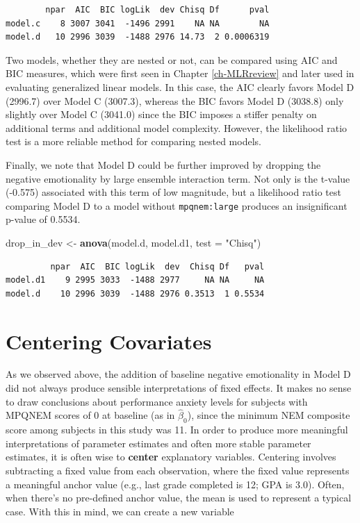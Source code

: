 \documentclass[
]{krantz}
\newenvironment{Shaded}{\begin{snugshade}}{\end{snugshade}}
\newcommand{\AttributeTok}[1]{\textcolor[rgb]{0.27,0.27,0.27}{#1}}
\newcommand{\FunctionTok}[1]{\textcolor[rgb]{0.27,0.27,0.27}{\textbf{#1}}}
\newcommand{\NormalTok}[1]{#1}
\newcommand{\OtherTok}[1]{\textcolor[rgb]{0.37,0.37,0.37}{#1}}
\newcommand{\StringTok}[1]{\textcolor[rgb]{0.5,0.5,0.5}{#1}}
\begin{document}
\begin{verbatim}
        npar  AIC  BIC logLik  dev Chisq Df      pval
model.c    8 3007 3041  -1496 2991    NA NA        NA
model.d   10 2996 3039  -1488 2976 14.73  2 0.0006319
\end{verbatim}

Two models, whether they are nested or not, can be compared using AIC and BIC measures, which were first seen in Chapter \ref{ch-MLRreview} and later used in evaluating generalized linear models. In this case, the AIC clearly favors Model D (2996.7) over Model C (3007.3), whereas the BIC favors Model D (3038.8) only slightly over Model C (3041.0) since the BIC imposes a stiffer penalty on additional terms and additional model complexity. However, the likelihood ratio test is a more reliable method for comparing nested models.

Finally, we note that Model D could be further improved by dropping the negative emotionality by large ensemble interaction term. Not only is the t-value (-0.575) associated with this term of low magnitude, but a likelihood ratio test comparing Model D to a model without \texttt{mpqnem:large} produces an insignificant p-value of 0.5534.

\begin{Shaded}
\begin{Highlighting}[]
\NormalTok{drop\_in\_dev }\OtherTok{\textless{}{-}} \FunctionTok{anova}\NormalTok{(model.d, model.d1, }\AttributeTok{test =} \StringTok{"Chisq"}\NormalTok{)}
\end{Highlighting}
\end{Shaded}

\begin{verbatim}
         npar  AIC  BIC logLik  dev  Chisq Df   pval
model.d1    9 2995 3033  -1488 2977     NA NA     NA
model.d    10 2996 3039  -1488 2976 0.3513  1 0.5534
\end{verbatim}

\section{Centering Covariates}\label{sec:modele}

As we observed above, the addition of baseline negative emotionality in Model D did not always produce sensible interpretations of fixed effects. It makes no sense to draw conclusions about performance anxiety levels for subjects with MPQNEM scores of 0 at baseline (as in \(\hat{\beta}_{0}\)), since the minimum NEM composite score among subjects in this study was 11. In order to produce more meaningful interpretations of parameter estimates and often more stable parameter estimates, it is often wise to \textbf{center}  explanatory variables. Centering involves subtracting a fixed value from each observation, where the fixed value represents a meaningful anchor value (e.g., last grade completed is 12; GPA is 3.0). Often, when there's no pre-defined anchor value, the mean is used to represent a typical case. With this in mind, we can create a new variable
\end{document}
